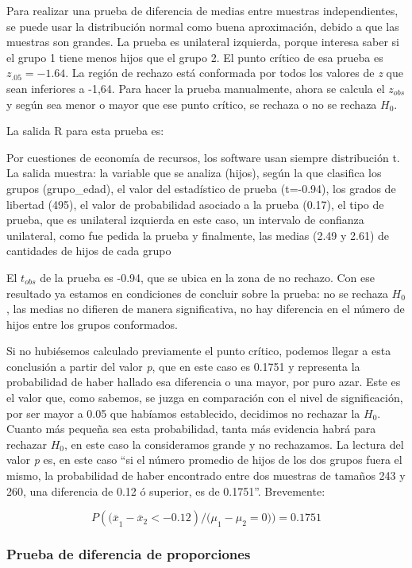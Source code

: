 \documentclass[]{book}
\begin{document}
Para realizar una prueba de diferencia de medias entre muestras independientes, se puede usar la distribución normal como buena aproximación, debido a que las muestras son grandes. La prueba es unilateral izquierda, porque interesa saber si el grupo 1 tiene menos hijos que el grupo 2. El punto crítico de esa prueba es \(z_{.05}=-1.64\). La región de rechazo está conformada por todos los valores de \emph{z} que sean inferiores a -1,64. Para hacer la prueba manualmente, ahora se calcula el \(z_{obs}\) y según sea menor o mayor que ese punto crítico, se rechaza o no se rechaza \(H_0\).

La salida R para esta prueba es:

Por cuestiones de economía de recursos, los software usan siempre distribución t. La salida muestra: la variable que se analiza (hijos), según la que clasifica los grupos (grupo\_edad), el valor del estadístico de prueba (t=-0.94), los grados de libertad (495), el valor de probabilidad asociado a la
prueba (0.17), el tipo de prueba, que es unilateral izquierda en este caso, un intervalo de confianza unilateral, como fue pedida la prueba y finalmente, las medias (2.49 y 2.61) de cantidades de hijos de cada grupo

El \(t_{obs}\) de la prueba es -0.94, que se ubica en la zona de no rechazo. Con ese resultado ya estamos en condiciones de concluir sobre la prueba: no se rechaza \(H_0\), las medias no difieren de manera significativa, no hay diferencia en el número de hijos entre los grupos conformados.

Si no hubiésemos calculado previamente el punto crítico, podemos llegar
a esta conclusión a partir del valor \emph{p}, que en este caso es 0.1751 y
representa la probabilidad de haber hallado esa diferencia o una mayor,
por puro azar. Este es el valor que, como sabemos, se juzga en
comparación con el nivel de significación, por ser mayor a 0.05 que
habíamos establecido, decidimos no rechazar la \(H_0\). Cuanto más pequeña
sea esta probabilidad, tanta más evidencia habrá para rechazar \(H_0\), en
este caso la consideramos grande y no rechazamos. La lectura del valor
\emph{p} es, en este caso ``si el número promedio de hijos de los dos grupos
fuera el mismo, la probabilidad de haber encontrado entre dos muestras
de tamaños 243 y 260, una diferencia de 0.12 ó superior, es de 0.1751''.
Brevemente:

\[P({(\overline{x}}_{1} - {\overline{x}}_{2} < - 0.12)/{(\mu}_{1} - \mu_{2} = 0)) = 0.1751\]

\hypertarget{prueba-de-diferencia-de-proporciones}{%
\subsubsection{Prueba de diferencia de proporciones}\label{prueba-de-diferencia-de-proporciones}}
\end{document}
